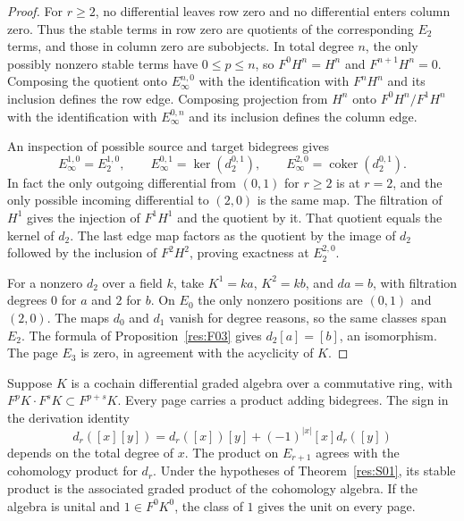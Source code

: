 \begin{proof}
For $r\geq2$, no differential leaves row zero and no differential
enters column zero. Thus the stable terms in row zero are quotients
of the corresponding $E_2$ terms, and those in column zero are
subobjects. In total degree $n$, the only possibly nonzero
stable terms have $0\leq p\leq n$, so $F^0H^n=H^n$ and
$F^{n+1}H^n=0$. Composing the quotient onto $E_\infty^{n,0}$
with the identification with $F^nH^n$ and its inclusion defines
the row edge. Composing projection from $H^n$ onto $F^0H^n/F^1H^n$
with the identification with $E_\infty^{0,n}$ and its inclusion
defines the column edge.

An inspection of possible source and target bidegrees gives
\[
 E_\infty^{1,0}=E_2^{1,0},\qquad
 E_\infty^{0,1}=\ker(d_2^{0,1}),\qquad
 E_\infty^{2,0}=\operatorname{coker}(d_2^{0,1}).
\]
In fact the only outgoing differential from $(0,1)$ for $r\geq2$
is at $r=2$, and the only possible incoming differential to
$(2,0)$ is the same map. The filtration of $H^1$ gives the
injection of $F^1H^1$ and the quotient by it. That quotient
equals the kernel of $d_2$. The last edge map factors as the
quotient by the image of $d_2$ followed by the inclusion of
$F^2H^2$, proving exactness at $E_2^{2,0}$.

For a nonzero $d_2$ over a field $k$, take
$K^1=k a$, $K^2=k b$, and $d a=b$, with filtration degrees
$0$ for $a$ and $2$ for $b$. On $E_0$ the only nonzero positions are
$(0,1)$ and $(2,0)$. The maps $d_0$ and $d_1$ vanish for degree
reasons, so the same classes span $E_2$. The formula of
Proposition~\ref{res:F03} gives $d_2[a]=[b]$, an isomorphism.
The page $E_3$ is zero, in agreement with the acyclicity of $K$.
\end{proof}

\begin{proposition}
\label{res:S06}
Suppose $K$ is a cochain differential graded algebra over a commutative
ring, with $F^pK\cdot F^sK\subset F^{p+s}K$.
Every page carries a product adding bidegrees. The sign in the
derivation identity
\[
 d_r([x][y])=d_r([x])[y]+(-1)^{|x|}[x]d_r([y])
\]
depends on the total degree of $x$.
The product on $E_{r+1}$ agrees with the cohomology product for
$d_r$. Under the hypotheses of Theorem~\ref{res:S01}, its stable
product is the associated graded product of the cohomology algebra.
If the algebra is unital and $1\in F^0K^0$, the class of $1$
gives the unit on every page.
\end{proposition}

